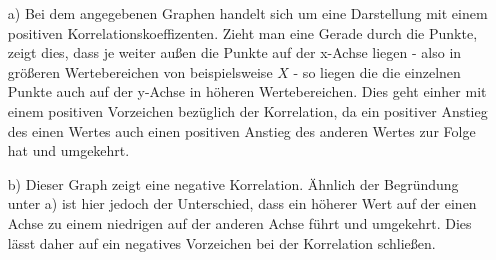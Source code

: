 \begin{enumerate}
	\item[a)] Bei dem angegebenen Graphen handelt sich um eine Darstellung mit einem positiven Korrelationskoeffizenten. Zieht man eine Gerade durch die Punkte, zeigt dies, dass je weiter außen die Punkte auf der x-Achse liegen - also in größeren Wertebereichen von beispielsweise $X$ - so liegen die die einzelnen Punkte auch auf der y-Achse in höheren Wertebereichen. Dies geht einher mit einem positiven Vorzeichen bezüglich der Korrelation, da ein positiver Anstieg des einen Wertes auch einen positiven Anstieg des anderen Wertes zur Folge hat und umgekehrt.
	\item[b)] Dieser Graph zeigt eine negative Korrelation. Ähnlich der Begründung unter a) ist hier jedoch der Unterschied, dass ein höherer Wert auf der einen Achse zu einem niedrigen auf der anderen Achse führt und umgekehrt. Dies lässt daher auf ein negatives Vorzeichen bei der Korrelation schließen.
\end{enumerate}